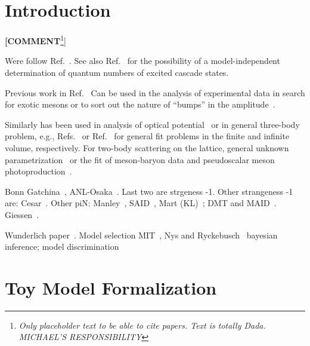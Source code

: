 \documentclass[aps, prd, twocolumn, showpacs, superscriptaddress,
preprintnumbers, nofootinbib]{revtex4-1}
\newcommand{\com}[1]{{\color{orange}\textbf{[COMMENT}\footnote{\color{orange}\textit{#1}}]}}
\begin{document}
\section{Introduction} \label{sec:intro}

\com{Only placeholder text to be able to cite papers. Text is totally Dada. MICHAEL'S RESPONSIBILITY}

Were follow Ref.~\cite{Jackson:2015dva}. See also Ref.~\cite{Jackson:2013bba} for the possibility of a model-independent determination of quantum numbers of excited cascade states.

Previous work in Ref.~\cite{Landay:2016cjw} Can be used in the analysis of experimental data in search for exotic  mesons or to sort out the nature of ``bumps'' in the amplitude~\cite{Jackura:2017amb, Molina:2017iaa, Pilloni:2016obd}.

Similarly has been used in analysis of optical potential~\cite{Agadjanov:2016mao} or in general three-body problem, e.g., Refs.~\cite{Briceno:2016mjc,Hammer:2017kms,Hammer:2017uqm} or Ref.~\cite{Mai:2017vot,Kamano:2011ih} for general fit problems in the finite and infinite volume, respectively. For two-body scattering on the lattice, general unknown parametrization~\cite{Briceno:2016mjc,Doring:2011vk,Doring:2011ip,Doring:2011nd,Doring:2013glu} or the fit of meson-baryon data and pseudoscalar meson photoproduction~\cite{Doring:2010ap, Huang:2011as, Ronchen:2012eg, Ronchen:2014cna, Ronchen:2015vfa}.

Bonn Gatchina~\cite{Anisovich:2011fc, Collins:2017sgu}, ANL-Osaka~\cite{Kamano:2013iva, Kamano:2014zba, Kamano:2015hxa}. Last two are strgeness -1. Other strangeness -1 are: Cesar~\cite{Fernandez-Ramirez:2015tfa}. Other piN: Manley~\cite{Shrestha:2012ep}, SAID~\cite{Workman:2012jf, Workman:2012hx, Workman:2016irf, Tiator:2016btt}, Mart (KL)~\cite{Mart:2017mwj}; DMT and MAID~\cite{Kamalov:2000en, Chiang:2002vq, Tiator:2010rp, Drechsel:1998hk, Drechsel:2007if}. Giessen~\cite{Shklyar:2014kra, Cao:2013psa}.

Wunderlich paper~\cite{Wunderlich:2016imj}. Model selection MIT~\cite{Guegan:2015mea, Williams:2017gwf}, Nys and Ryckebusch~\cite{DeCruz:2012bv,DeCruz:2011xi} bayesian inference; model discrimination~\cite{Nys:2016uel}


\section{Toy Model Formalization}
\end{document}
